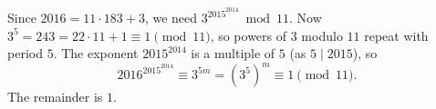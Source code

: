 Since $2016=11\cdot183+3$, we need $3^{2015^{2014}}\bmod11$. Now $3^5=243=22\cdot11+1\equiv1\pmod{11}$, so powers of $3$ modulo $11$ repeat with period $5$. The exponent $2015^{2014}$ is a multiple of $5$ (as $5\mid2015$), so
\[
2016^{2015^{2014}}\equiv3^{5m}=\left(3^5\right)^m\equiv1\pmod{11}.
\]
The remainder is $\boxed{1}$.
